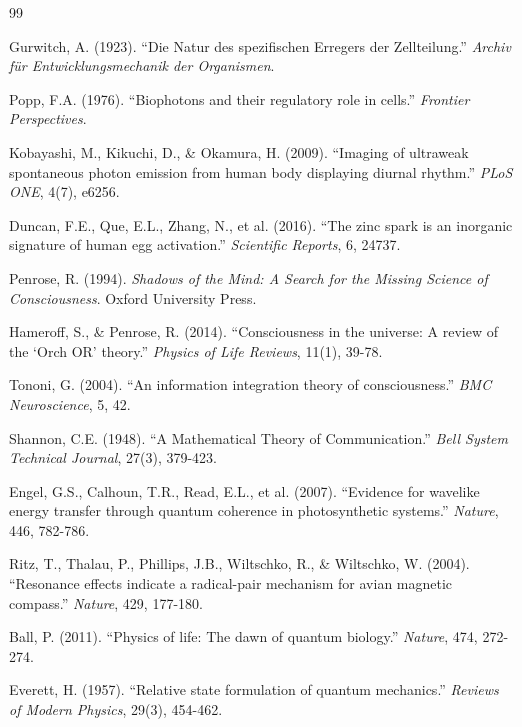 \documentclass[12pt,a4paper]{article}
\begin{document}
\begin{thebibliography}{99}

Gurwitch, A. (1923). ``Die Natur des spezifischen Erregers der Zellteilung.'' \textit{Archiv für Entwicklungsmechanik der Organismen}.

Popp, F.A. (1976). ``Biophotons and their regulatory role in cells.'' \textit{Frontier Perspectives}.

Kobayashi, M., Kikuchi, D., \& Okamura, H. (2009). ``Imaging of ultraweak spontaneous photon emission from human body displaying diurnal rhythm.'' \textit{PLoS ONE}, 4(7), e6256.

Duncan, F.E., Que, E.L., Zhang, N., et al. (2016). ``The zinc spark is an inorganic signature of human egg activation.'' \textit{Scientific Reports}, 6, 24737.

Penrose, R. (1994). \textit{Shadows of the Mind: A Search for the Missing Science of Consciousness}. Oxford University Press.

Hameroff, S., \& Penrose, R. (2014). ``Consciousness in the universe: A review of the `Orch OR' theory.'' \textit{Physics of Life Reviews}, 11(1), 39-78.

Tononi, G. (2004). ``An information integration theory of consciousness.'' \textit{BMC Neuroscience}, 5, 42.

Shannon, C.E. (1948). ``A Mathematical Theory of Communication.'' \textit{Bell System Technical Journal}, 27(3), 379-423.

Engel, G.S., Calhoun, T.R., Read, E.L., et al. (2007). ``Evidence for wavelike energy transfer through quantum coherence in photosynthetic systems.'' \textit{Nature}, 446, 782-786.

Ritz, T., Thalau, P., Phillips, J.B., Wiltschko, R., \& Wiltschko, W. (2004). ``Resonance effects indicate a radical-pair mechanism for avian magnetic compass.'' \textit{Nature}, 429, 177-180.

Ball, P. (2011). ``Physics of life: The dawn of quantum biology.'' \textit{Nature}, 474, 272-274.

Everett, H. (1957). ``Relative state formulation of quantum mechanics.'' \textit{Reviews of Modern Physics}, 29(3), 454-462.


\end{thebibliography}
\end{document}
